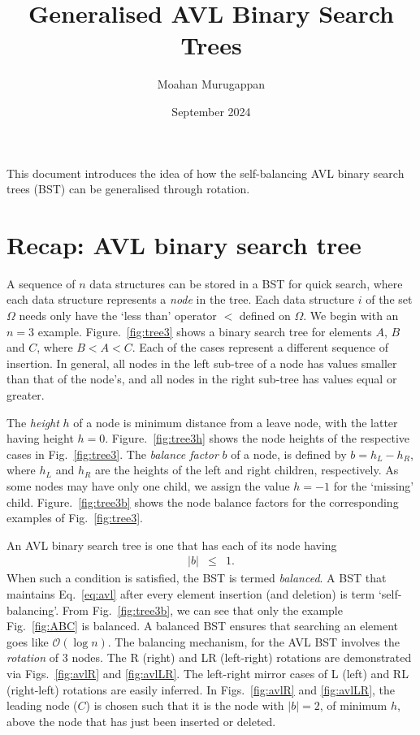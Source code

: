 \documentclass{article}
\title{Generalised AVL Binary Search Trees}
\author{Moahan Murugappan}
\date{September 2024}
\begin{document}
\maketitle

This document introduces the idea of how the self-balancing AVL binary search trees (BST) can be generalised through rotation.

\section{Recap: AVL binary search tree}
A sequence of $n$ data structures can be stored in a BST for quick search, where each data structure represents a \textit{node} in the tree. Each data structure $i$ of the set $\Omega$ needs only have the `less than' operator $<$ defined on $\Omega$. We begin with an $n=3$ example. Figure.~\ref{fig:tree3} shows a binary search tree for elements $A$, $B$ and $C$, where $B<A<C$. Each of the cases represent a different sequence of insertion. In general, all nodes in the left sub-tree of a node has values smaller than that of the node's, and all nodes in the right sub-tree has values equal or greater.

\vspace{5mm}

The \textit{height} $h$ of a node is minimum distance from a leave node, with the latter having height $h=0$. Figure.~\ref{fig:tree3h} shows the node heights of the respective cases in Fig.~\ref{fig:tree3}. The \textit{balance factor} $b$ of a node, is defined by $b=h_L- h_R$, where $h_L$ and $h_R$ are the heights of the left and right children, respectively. As some nodes may have only one child, we assign the value $h=-1$ for the `missing' child. Figure.~\ref{fig:tree3b} shows the node balance factors for the corresponding examples of Fig.~\ref{fig:tree3}.

\vspace{5mm}

An AVL binary search tree is one that has each of its node having
\begin{eqnarray}
    |b| &\leq& 1. \label{eq:avl}
\end{eqnarray}
When such a condition is satisfied, the BST is termed \textit{balanced}. A BST that maintains Eq.~\ref{eq:avl} after every element insertion (and deletion) is term `self-balancing'. From Fig.~\ref{fig:tree3b}, we can see that only the example Fig.~\ref{fig:ABC} is balanced. A balanced BST ensures that searching an element goes like $\mathcal{O}(\log n)$. The balancing mechanism, for the AVL BST involves the \textit{rotation} of 3 nodes. The R (right) and LR (left-right) rotations are demonstrated via Figs.~\ref{fig:avlR} and \ref{fig:avlLR}. The left-right mirror cases of L (left) and RL (right-left) rotations are easily inferred. In Figs.~\ref{fig:avlR} and \ref{fig:avlLR}, the leading node ($C$) is chosen such that it is the node with $|b|=2$, of minimum $h$, above the node that has just been inserted or deleted.
\end{document}
